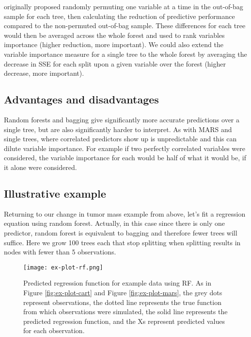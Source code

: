 \documentclass[12pt]{article}
\begin{document}
\textcite{rf} originally proposed randomly permuting one variable at a time in the out-of-bag sample for each tree, then calculating the reduction of predictive performance compared to the non-permuted out-of-bag sample. These differences for each tree would then be averaged across the whole forest and used to rank variables importance (higher reduction, more important). We could also extend the variable importance measure for a single tree to the whole forest by averaging the decrease in SSE for each split upon a given variable over the forest (higher decrease, more important).


\subsection{Advantages and disadvantages} %
\label{sub:advantages_and_disadvantages_rf}

Random forests and bagging give significantly more accurate predictions over a single tree, but are also significantly harder to interpret. As with MARS and single trees, where correlated predictors show up is unpredictable and this can dilute variable importance. For example if two perfectly correlated variables were considered, the variable importance for each would be half of what it would be, if it alone were considered.


\subsection{Illustrative example} %
\label{sub:example}

Returning to our change in tumor mass example from above, let's fit a regression equation using random forest. Actually, in this case since there is only one predictor, random forest is equivalent to bagging and therefore fewer trees will suffice. Here we grow 100 trees each that stop splitting when splitting results in nodes with fewer than 5 observations. 

\begin{figure}[h]
\begin{center}
\texttt{[image: ex-plot-rf.png]}
\end{center}
\caption[Predicted regression function for example data using RF]{Predicted regression function for example data using RF. As in Figure \ref{fig:ex-plot-cart} and Figure \ref{fig:ex-plot-mars}, the grey dots represent observations, the dotted line represents the true function from which observations were simulated, the solid line represents the predicted regression function, and the Xs represent predicted values for each observation.}
\label{fig:ex-plot-rf}
\end{figure}
\end{document}
